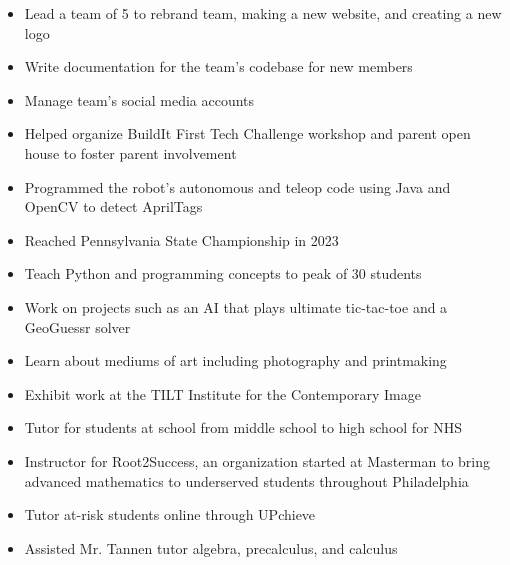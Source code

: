 \documentclass[9pt,letterpaper,ragged2e,withhyper]{altacv}
\begin{document}
\begin{paracol}{2}

\begin{itemize}
\item Lead a team of 5 to rebrand team, making a new website, and creating a new logo
\item Write documentation for the team's codebase for new members
\item Manage team's social media accounts
\item Helped organize BuildIt First Tech Challenge workshop and parent open house to foster parent involvement
\item Programmed the robot's autonomous and teleop code using Java and OpenCV to detect AprilTags
\item Reached Pennsylvania State Championship in 2023
\end{itemize}

\divider

\begin{itemize}
\item Teach Python and programming concepts to peak of 30 students
\item Work on projects such as an AI that plays ultimate tic-tac-toe and a GeoGuessr solver
\end{itemize}

\divider

\begin{itemize}
\item Learn about mediums of art including photography and printmaking
\item Exhibit work at the TILT Institute for the Contemporary Image
\end{itemize}

\divider

\begin{itemize}
\item Tutor for students at school from middle school to high school for NHS
\item Instructor for Root2Success, an organization started at Masterman to bring advanced mathematics to underserved students throughout Philadelphia
\item Tutor at-risk students online through UPchieve
\item Assisted Mr. Tannen tutor algebra, precalculus, and calculus
\end{itemize}


\end{paracol}
\end{document}
